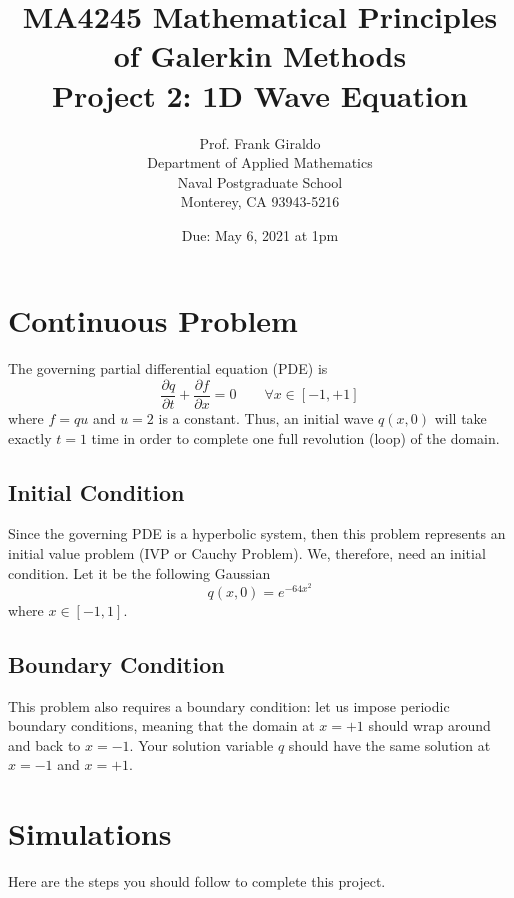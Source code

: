 \documentclass[10pt]{article}
\newcommand{\diff}[2] {\frac{\partial #1}{\partial #2}}
\begin{document}
\title{MA4245 Mathematical Principles of Galerkin Methods \\
Project 2: 1D Wave Equation}
\author{Prof. Frank Giraldo \\
Department of Applied Mathematics \\
Naval Postgraduate School \\
Monterey, CA 93943-5216}
\date{Due: May 6, 2021 at 1pm}
\maketitle

\section{Continuous Problem}
The governing partial differential equation (PDE) is
\[
\diff{q}{t} + \diff{f}{x} = 0 \qquad \forall x \in [-1,+1]
\]
where $f=qu$ and $u=2$ is a constant. Thus, an initial wave $q(x,0)$ will take exactly $t=1$ time in order to 
complete one full revolution (loop) of the domain. 

\subsection{Initial Condition}
Since the governing PDE is a hyperbolic system, then this problem represents an initial value problem (IVP or Cauchy Problem).  We, therefore, need 
an initial condition. 
Let it be the following Gaussian
\[
q(x,0)=e^{ - 64 x^2 }
\]
where $x \in [-1,1]$.

\subsection{Boundary Condition}
This problem also requires a boundary condition: let us impose periodic boundary conditions, meaning that the domain at $x=+1$ should wrap around 
and back to $x=-1$. Your solution variable $q$ should have the same solution at $x=-1$ and $x=+1$.

\section{Simulations}

Here are the steps you should follow to complete this project.
\end{document}
